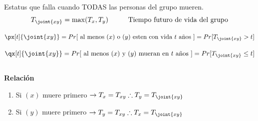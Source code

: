 \documentclass[12pt, a4paper, footinclude=true]{scrbook}
\begin{document}
Estatus que falla cuando {\color{red} TODAS} las personas del grupo mueren. \\


$$T_{\joint{xy}} = \max(T_x, T_y)\hspace{1cm} \text{Tiempo futuro de vida del grupo}$$ 

$$\px[t]{\joint{xy}} = Pr[ \text{ al menos } (x) \text{ o } (y) \text{ esten con vida } t \text{ años } ] =Pr[T_{\joint{xy}} > t]$$

$$\qx[t]{\joint{xy}} = Pr[ \text{ al menos } (x) \text{ y } (y) \text{ mueran en } t \text{ años } ] =Pr[T_{\joint{xy}} \leq t]
$$\\



\textbf{Relación}

\begin{enumerate}
	\item Si $(x)$ muere primero $\rightarrow T_x = T_{xy} \therefore T_y = T_{\joint{xy}}$
	\item Si $(y)$ muere primero $\rightarrow T_y = T_{xy} \therefore T_x = T_{\joint{xy}}$
\end{enumerate}

\vspace{1cm}

\end{document}
